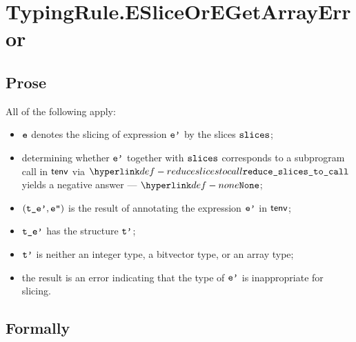 
\section{TypingRule.ESliceOrEGetArrayError \label{sec:TypingRule.ESliceOrEGetArrayError}}

\subsection{Prose}
All of the following apply:
\begin{itemize}
  \item $\ve$ denotes the slicing of expression $\vep$ by the slices $\slices$;
  \item determining whether $\vep$ together with $\slices$ corresponds to a subprogram call
  in $\tenv$ via $\reduceslicestocall$ yields a negative answer --- $\None$\ProseOrTypeError;
  \item $(\tep,\vepp)$ is the result of annotating the expression $\vep$ in $\tenv$;
  \item $\tep$ has the structure $\vtp$;
  \item $\vtp$ is neither an integer type, a bitvector type, or an array type;
  \item the result is an error indicating that the type of $\vep$ is inappropriate for slicing.
\end{itemize}



\subsection{Formally}
\begin{mathpar}
\end{mathpar}

